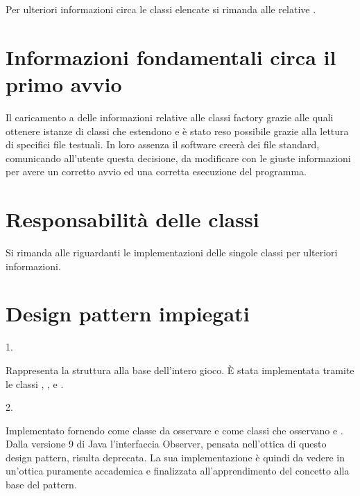 \documentclass[letterpaper,10pt,italian,openany,oneside]{sphinxmanual}
\begin{document}
Per ulteriori informazioni circa le classi elencate si rimanda alle relative {\hyperref[\detokenize{source/packages::doc}]{}}.


\section{Informazioni fondamentali circa il primo avvio}
\label{\detokenize{introduzione:informazioni-fondamentali-circa-il-primo-avvio}}
Il caricamento a  delle informazioni relative alle classi factory grazie alle quali ottenere istanze di classi che estendono
 e  è stato reso possibile grazie alla lettura di specifici file testuali. In loro assenza il software creerà
dei file standard, comunicando all’utente questa decisione, da modificare  con le giuste informazioni per avere un
corretto avvio ed una corretta esecuzione del programma.


\section{Responsabilità delle classi}
\label{\detokenize{introduzione:responsabilita-delle-classi}}
Si rimanda alle {\hyperref[\detokenize{source/packages::doc}]{}} riguardanti le implementazioni delle singole classi per ulteriori informazioni.


\section{Design pattern impiegati}
\label{\detokenize{introduzione:design-pattern-impiegati}}
1.  %
\begin{footnote}[2]\sphinxAtStartFootnote
{}
%
\end{footnote}
Rappresenta la struttura alla base dell’intero gioco. È stata implementata tramite le classi , ,  e .

2.  %
\begin{footnote}[3]\sphinxAtStartFootnote
{}
%
\end{footnote}
Implementato fornendo come classe da osservare  e come classi che osservano  e . Dalla versione 9 di Java l’interfaccia Observer, pensata nell’ottica di questo design pattern, risulta deprecata. La sua implementazione è quindi da vedere in un’ottica puramente accademica e finalizzata all’apprendimento del concetto alla base del pattern.
\end{document}
